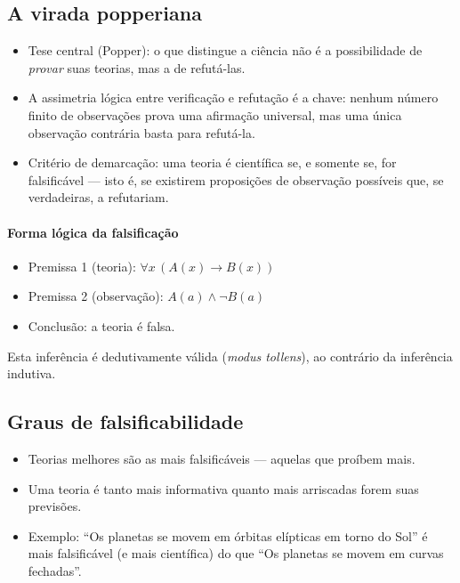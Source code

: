 \documentclass[9pt,a4paper]{extarticle}
\newcommand{\impt}[1]{\textcolor{important}{#1}}
\newcommand{\ntc}[1]{\textcolor{notice}{#1}}
\begin{document}
\subsection{A virada popperiana}

\begin{itemize}
    \item \ntc{Tese central (Popper)}: o que distingue a ciência não é a possibilidade de \emph{provar} suas teorias, mas a de \impt{refutá-las}.
    \item A assimetria lógica entre verificação e refutação é a chave: nenhum número finito de observações prova uma afirmação universal, mas \impt{uma única observação contrária basta para refutá-la}.
    \item \ntc{Critério de demarcação}: uma teoria é científica se, e somente se, for \impt{falsificável} --- isto é, se existirem proposições de observação possíveis que, se verdadeiras, a refutariam.
\end{itemize}

\paragraph{Forma lógica da falsificação}

\begin{itemize}
    \item Premissa 1 (teoria): \(\forall x\,(A(x) \rightarrow B(x))\)
    \item Premissa 2 (observação): \(A(a) \land \lnot B(a)\)
    \item Conclusão: a teoria é falsa.
\end{itemize}

Esta inferência é \ntc{dedutivamente válida} (\textit{modus tollens}), ao contrário da inferência indutiva.

\subsection{Graus de falsificabilidade}

\begin{itemize}
    \item Teorias melhores são as \impt{mais falsificáveis} --- aquelas que proíbem mais.
    \item Uma teoria é tanto mais informativa quanto mais arriscadas forem suas previsões.
    \item Exemplo: ``Os planetas se movem em órbitas elípticas em torno do Sol'' é mais falsificável (e mais científica) do que ``Os planetas se movem em curvas fechadas''.
\end{itemize}
\end{document}
